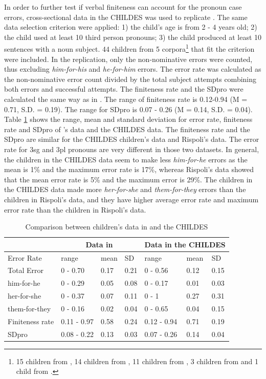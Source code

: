 In order to further test if verbal finiteness can account for the pronoun case errors, cross-sectional data in the  CHILDES was used to replicate \cite{rispoli2005}. The same data selection criterion were applied: 1) the child's age is from 2 - 4 years old; 2) the child used at least 10 third person pronouns; 3) the child produced at least 10 sentences with a noun subject. 44 children from 5 corpora\footnote{15 children from \cite{tommerdahl2013analyzing}, 14 children from \cite{van1980effects}, 11 children from \cite{valian1991syntactic}, 3 children from \cite{gleason1980acquisition} and 1 child from \cite{howe1981acquiring}.} that fit the criterion were included. In the replication, only the non-nominative errors were counted, thus excluding \textit{him-for-his} and \textit{he-for-him} errors. The error rate was calculated as the non-nominative error count divided by the total subject attempts combining both errors and successful attempts. The finiteness rate and the SDpro were calculated the same way as in \cite{rispoli2005}. The range of finiteness rate is 0.12-0.94 (M = 0.71, S.D. = 0.19). The range for SDpro is 0.07 - 0.26 (M = 0.14, S.D. = 0.04). Table \ref{tab:comparison} shows the range, mean and standard deviation for error rate, finiteness rate and SDpro of \cite{rispoli2005}'s data and the CHILDES data. The finiteness rate and the SDpro are similar for the CHILDES children's data and Rispoli's data. The error rate for 3sg and 3pl pronouns are very different in those two datasets. In general, the children in the CHILDES data seem to make less \textit{him-for-he} errors as the mean is 1\% and the maximum error rate is 17\%, whereas Rispoli's data showed that the mean error rate is 5\% and the maximum error is 29\%. The children in the CHILDES data made more \textit{her-for-she} and \textit{them-for-they} errors than the children in Rispoli's data, and they have higher average error rate and maximum error rate than the children in Rispoli's data. 

\FloatBarrier
\begin{table}[!h]
\centering
\caption{Comparison between children's data in \cite{rispoli2005} and the CHILDES}
\label{tab:comparison}
\begin{tabular}{llll|lll}
\toprule
 & \multicolumn{3}{c|}{Data in \cite{rispoli2005}} & \multicolumn{3}{c}{Data in the CHILDES} \\ \hline
Error Rate & range & mean & SD & range & mean & SD \\ \hline
Total Error & 0 - 0.70 & 0.17 & 0.21 & 0 - 0.56 & 0.12 & 0.15\\
him-for-he & 0 - 0.29 & 0.05 & 0.08 & 0 - 0.17 & 0.01 & 0.03 \\
her-for-she & 0 - 0.37 & 0.07 & 0.11 & 0 - 1 & 0.27 & 0.31 \\
them-for-they & 0 - 0.16 & 0.02 & 0.04 & 0 - 0.65 & 0.04 & 0.15 \\ \hline
Finiteness rate & 0.11 - 0.97 & 0.58 & 0.24 & 0.12 - 0.94 & 0.71 & 0.19 \\ \hline
SDpro & 0.08 - 0.22 & 0.13 & 0.03 & 0.07 - 0.26 & 0.14 & 0.04\\
\bottomrule
\end{tabular}
\end{table}
\FloatBarrier

